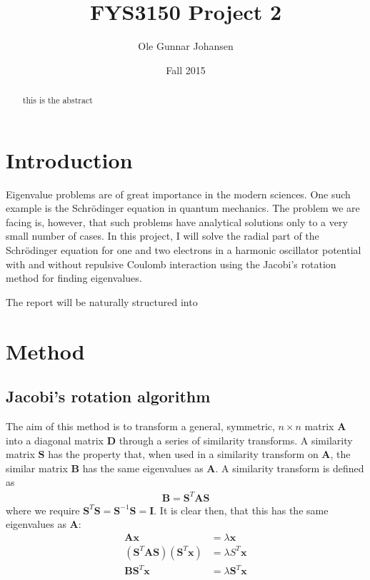 \documentclass[11pt, a4paper]{article}
\title{FYS3150 Project 2}
\date{Fall 2015}
\author{Ole Gunnar Johansen}
\newcommand{\SL}{Schr\"{o}dinger }
\newcommand{\A}{\mathbf{A}}
\renewcommand{\S}{\mathbf{S}}
\newcommand{\B}{\mathbf{B}}
\newcommand{\x}{\mathbf{x}}
\begin{document}
	\maketitle
	
	\begin{abstract}
		this is the abstract\cite{BibTex}
	\end{abstract}
	
	\section{Introduction}
		Eigenvalue problems are of great importance in the modern sciences. One such example is the \SL equation in quantum mechanics. The problem we are facing is, however, that such problems have analytical solutions only to a very small number of cases. In this project, I will solve the radial part of the \SL equation for one and two electrons in a harmonic oscillator potential with and without repulsive Coulomb interaction using the Jacobi's rotation method for finding eigenvalues.
		
		The report will be naturally structured into 

	
	\section{Method}
		\subsection{Jacobi's rotation algorithm}
		\label{subsec: jacobi algo}
			The aim of this method is to transform a general, symmetric, $n\times n$ matrix $\A$ into a diagonal matrix $\mathbf{D}$ through a series of similarity transforms. A similarity matrix $\S$ has the property that, when used in a similarity transform on $\A$, the similar matrix $\B$ has the same eigenvalues as $\A$. A similarity transform is defined as
			\begin{align*}
				\B = \S^T \A \S
			\end{align*}
			where we require $\S^T\S = \S^{-1}\S = \mathbf{I}$. It is clear then, that this has the same eigenvalues as $\A$:
			\begin{align*}
				\A \x &= \lambda \x \\
				(\S^T\A \S)(\S^T\x) &= \lambda S^T\x \\
				\B \S^T \x &= \lambda \S^T \x 
			\end{align*}
			
\end{document}
